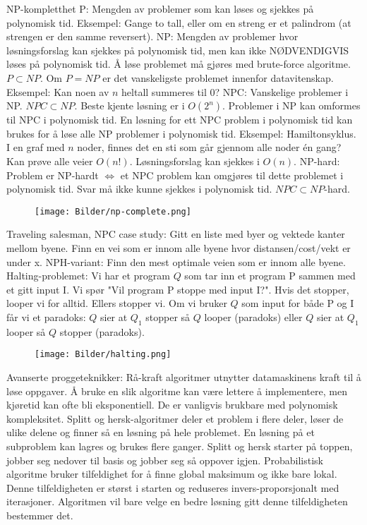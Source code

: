 \documentclass[10pt,a4paper]{article}
\begin{document}
\begin{multicols}{4}
{\noindent
\color{red} NP-kompletthet \color{black} 
\noindent
P: Mengden av problemer som kan løses og sjekkes på polynomisk tid. Eksempel: Gange to tall, eller om en streng er et palindrom (at strengen er den samme reversert). NP: Mengden av problemer hvor løsningsforslag kan sjekkes på polynomisk tid, men kan ikke NØDVENDIGVIS løses på polynomisk tid. Å løse problemet må gjøres med brute-force algoritme. $P \subset NP$. Om $P = NP$ er det vanskeligste problemet innenfor datavitenskap. Eksempel: Kan noen av $n$ heltall summeres til 0? NPC: Vanskelige problemer i NP. $NPC \subset NP$. Beste kjente løsning er i $O(2^n)$. Problemer i NP kan omformes til NPC i polynomisk tid. En løsning for ett NPC problem i polynomisk tid kan brukes for å løse alle NP problemer i polynomisk tid. Eksempel: Hamiltonsyklus. I en graf med $n$ noder, finnes det en sti som går gjennom alle noder én gang? Kan prøve alle veier $O(n!)$. Løsningsforslag kan sjekkes i $O(n)$. NP-hard: Problem er NP-hardt $\Leftrightarrow$ et NPC problem kan omgjøres til dette problemet i polynomisk tid. Svar må ikke kunne sjekkes i polynomisk tid. $NPC \subset NP$-hard.
\begin{figure}[H]
    \texttt{[image: Bilder/np-complete.png]}
\end{figure}
\noindent
\color{orange}Traveling salesman, NPC case study: \color{black}
Gitt en liste med byer og vektede kanter mellom byene. Finn en vei som er innom alle byene hvor distansen/cost/vekt er under x. NPH-variant: Finn den mest optimale veien som er innom alle byene.
\noindent
\color{orange}Halting-problemet: \color{black}
Vi har et program $Q$ som tar inn et program P sammen med et gitt input I. Vi spør "Vil program P stoppe med input I?". Hvis det stopper, looper vi for alltid. Ellers stopper vi. Om vi bruker $Q$ som input for både P og I får vi et paradoks: $Q$ sier at $Q_1$ stopper så $Q$ looper (paradoks) eller $Q$ sier at $Q_1$ looper så $Q$ stopper (paradoks).
\begin{figure}[H]
    \texttt{[image: Bilder/halting.png]}
\end{figure}
\noindent
\color{red}Avanserte proggeteknikker: \color{black}
\color{orange}Rå-kraft algoritmer \color{black} utnytter datamaskinens kraft til å løse oppgaver. Å bruke en slik algoritme kan være lettere å implementere, men kjøretid kan ofte bli eksponentiell. De er vanligvis brukbare med polynomisk kompleksitet. \color{orange}Splitt og hersk-algoritmer \color{black} deler et problem i flere deler, løser de ulike delene og finner så en løsning på hele problemet. En løsning på et subproblem kan lagres og brukes flere ganger. Splitt og hersk starter på toppen, jobber seg nedover til basis og jobber seg så oppover igjen. \color{orange}Probabilistisk algoritme \color{black} bruker tilfeldighet for å finne global maksimum og ikke bare lokal. Denne tilfeldigheten er størst i starten og reduseres invers-proporsjonalt med iterasjoner. Algoritmen vil bare velge en bedre løsning gitt denne tilfeldigheten bestemmer det.

}
\end{multicols}
\end{document}
